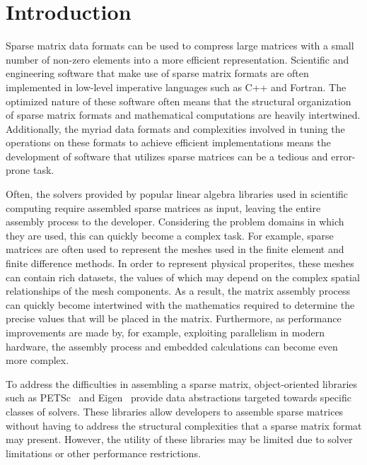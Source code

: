 \section{Introduction}

Sparse matrix data formats can be used to compress large matrices with a small number of non-zero elements into a more efficient representation.  
Scientific and engineering software that make use of sparse matrix formats are often implemented in low-level imperative languages such as C++ and Fortran.  The optimized nature of these software often means that the structural organization of sparse matrix formats and mathematical computations are heavily intertwined.  Additionally, the myriad data formats and complexities involved in tuning the operations on these formats to achieve efficient implementations means the development of software that utilizes sparse matrices can be a tedious and error-prone task.

Often, the solvers provided by popular linear algebra libraries used in scientific computing require assembled sparse matrices as input, leaving the entire assembly process to the developer.  Considering the problem domains in which they are used, this can quickly become a complex task.  For example, sparse matrices are often used to represent the meshes used in the finite element and finite difference methods.  In order to represent physical properites, these meshes can contain rich datasets, the values of which may depend on the complex spatial relationships of the mesh components.  As a result, the matrix assembly process can quickly become intertwined with the mathematics required to determine the precise values that will be placed in the matrix.  Furthermore, as performance improvements are made by, for example, exploiting parallelism in modern hardware, the assembly process and embedded calculations can become even more complex.

To address the difficulties in assembling a sparse matrix, object-oriented libraries such as PETSc~\cite{petsc2019} and Eigen~\cite{eigenweb2010} provide data abstractions targeted towards specific classes of solvers.  These libraries allow developers to assemble sparse matrices without having to address the structural complexities that a sparse matrix format may present.  However, the utility of these libraries may be limited due to solver limitations or other performance restrictions.

